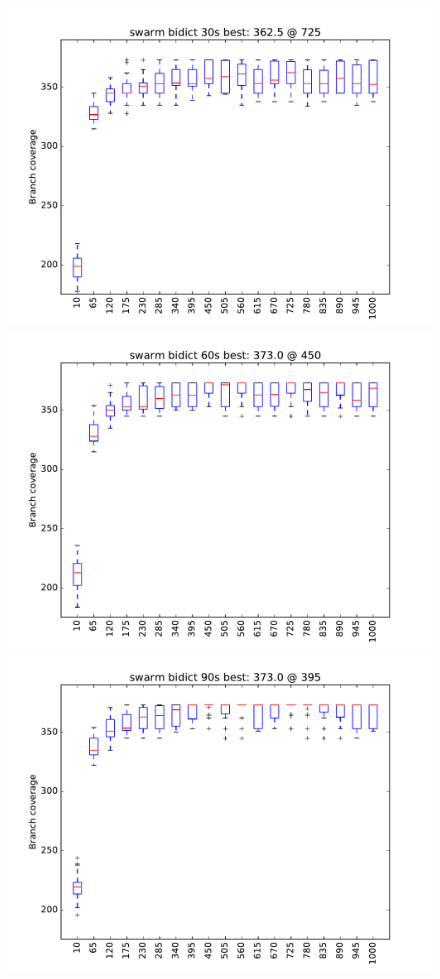 \begin{figure}
\includegraphics[width=\columnwidth]{graphs/bidictswarm30}
\includegraphics[width=\columnwidth]{graphs/bidictswarm60}
\includegraphics[width=\columnwidth]{graphs/bidictswarm90}
\end{figure}



